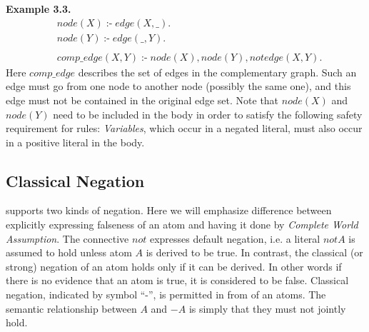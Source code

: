\documentclass[14pt,a4paper, titlepage]{article}
\DeclareMathOperator{\leftimpl}{:-}
\begin{document}
\textbf{Example 3.3.}
\begin{align*}
& \mathit{node}(X) \leftimpl \mathit{edge}(X, \_).\\
& \mathit{node}(Y) \leftimpl \mathit{edge}(\_, Y). \\
& \\
& \mathit{comp\_edge}(X, Y) \leftimpl \mathit{node}(X), \mathit{node}(Y), \mathit{not} \mathit{edge}(X, Y). 
\end{align*}
Here $\mathit{comp\_edge}$ describes the set of edges in the complementary graph. Such an edge must go from one node to another node (possibly the same one), and this edge must not be contained in the original edge set. Note that $\mathit{node}(X)$ and $\mathit{node}(Y)$ need to be included in the body in order to satisfy the following safety requirement for rules: \emph{Variables}, which occur in a negated literal, must also occur in a positive literal in the body.

\subsection{Classical Negation}
\dlvhex{} supports two kinds of negation. Here we will emphasize difference between explicitly expressing falseness of an atom and having it done by \emph{Complete World Assumption}. The connective $\mathit{not}$ expresses default negation, i.e. a literal $\mathit{not}$\text{ }$A$ is assumed to hold unless atom $A$ is derived to be true. In contrast, the classical (or strong) negation of an atom holds only if it can be derived. In other words if there is no evidence that an atom is true, it is considered to be false. Classical negation, indicated by symbol \enquote{-}, is permitted in from of an atoms. The semantic relationship between $A$ and $-A$ is simply that they must not jointly hold.
\end{document}
